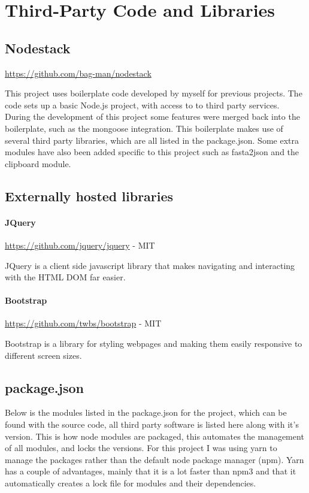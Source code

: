 \chapter{Third-Party Code and Libraries}
\section{Nodestack}

\url{https://github.com/bag-man/nodestack}

This project uses boilerplate code developed by myself for previous projects. The code sets up a basic Node.js project, with access to to third party services. During the development of this project some features were merged back into the boilerplate, such as the mongoose integration.  This boilerplate makes use of several third party libraries, which are all listed in the package.json. Some extra modules have also been added specific to this project such as fasta2json and the clipboard module. 

\section{Externally hosted libraries}
\subsubsection*{JQuery} 

\url{https://github.com/jquery/jquery} - MIT

JQuery is a client side javascript library that makes navigating and interacting with the HTML DOM far easier. 

\subsubsection*{Bootstrap} 

\url{https://github.com/twbs/bootstrap} - MIT

Bootstrap is a library for styling webpages and making them easily responsive to different screen sizes.

\section{package.json}
Below is the modules listed in the package.json for the project, which can be found with the source code, all third party software is listed here along with it's version. This is how node modules are packaged, this automates the management of all modules, and locks the versions. For this project I was using yarn\cite{yarn} to manage the packages rather than the default node package manager (npm)\cite{npm}. Yarn has a couple of advantages, mainly that it is a lot faster than npm3 and that it automatically creates a lock file for modules and their dependencies. 


